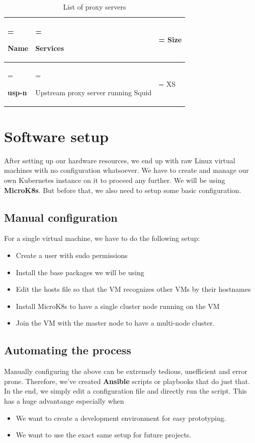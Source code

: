 \begin{table}[H]
    \renewcommand{\arraystretch}{1.5} %
    \caption{List of proxy servers}
    \centering
    \medskip
    \begin{tabularx}{1\textwidth} {
            | >{\hsize=1\hsize\linewidth=\hsize\raggedright\arraybackslash}X
            | >{\hsize=1.8\hsize\linewidth=\hsize\raggedright\arraybackslash}X
            | >{\hsize=0.2\hsize\linewidth=\hsize\centering\arraybackslash}X |}
        \hline
        \rowcolor{primary} \textbf{Name} & \textbf{Services}                   & \textbf{Size} \\
        \hline
        \textbf{usp-n}                   & Upstream proxy server running Squid & XS            \\
        \hline
    \end{tabularx}
\end{table}

\newpage
\section{Software setup}
After setting up our hardware resources, we end up with raw Linux virtual machines with no configuration whatsoever.
We have to create and manage our own Kubernetes instance on it to proceed any further.
We will be using {\bf MicroK8s}.
But before that, we also need to setup some basic configuration.

\subsection{Manual configuration}
For a single virtual machine, we have to do the following setup:

\begin{itemize}
    \item Create a user with sudo permissions
    \item Install the base packages we will be using
    \item Edit the hosts file so that the VM recognizes other VMs by their hostnames
    \item Install MicroK8s to have a single cluster node running on the VM
    \item Join the VM with the master node to have a multi-node cluster.
\end{itemize}

\subsection{Automating the process}
Manually configuring the above can be extremely tedious, unefficient and error prone.
Therefore, we've created {\bf Ansible} scripts or playbooks that do just that. In the end, we simply edit a configuration file and directly run the script.
This has a huge advantange especially when
\begin{itemize}
    \item We want to create a development environment for easy prototyping.
    \item We want to use the exact same setup for future projects.
\end{itemize}


